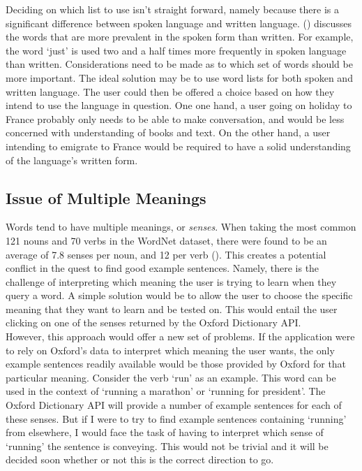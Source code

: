 Deciding on which list to use isn't straight forward, namely because there is a significant difference between spoken language and written language. (\cite{stenstrom1990lexical}) discusses the words that are more prevalent in the spoken form than written. For example, the word `just’ is used two and a half times more frequently in spoken language than written. Considerations need to be made as to which set of words should be more important. The ideal solution may be to use word lists for both spoken and written language. The user could then be offered a choice based on how they intend to use the language in question. One one hand, a user going on holiday to France probably only needs to be able to make conversation, and would be less concerned with understanding of books and text. On the other hand, a user intending to emigrate to France would be required to have a solid understanding of the language’s written form.

\subsection{Issue of Multiple Meanings}

Words tend to have multiple meanings, or \emph{senses}. When taking the most common 121 nouns and 70 verbs in the WordNet dataset, there were found to be an average of 7.8 senses per noun, and 12 per verb (\cite{ng1996integrating}). This creates a potential conflict in the quest to find good example sentences. Namely, there is the challenge of interpreting which meaning the user is trying to learn when they query a word. A simple solution would be to allow the user to choose the specific meaning that they want to learn and be tested on. This would entail the user clicking on one of the senses returned by the Oxford Dictionary API. \\

However, this approach would offer a new set of problems. If the application were to rely on Oxford’s data to interpret which meaning the user wants, the only example sentences readily available would be those provided by Oxford for that particular meaning. Consider the verb `run’ as an example. This word can be used in the context of `running a marathon’ or `running for president’. The Oxford Dictionary API will provide a number of example sentences for each of these senses. But if I were to try to find example sentences containing `running’ from elsewhere, I would face the task of having to interpret which sense of `running’ the sentence is conveying. This would not be trivial and it will be decided soon whether or not this is the correct direction to go. \\

